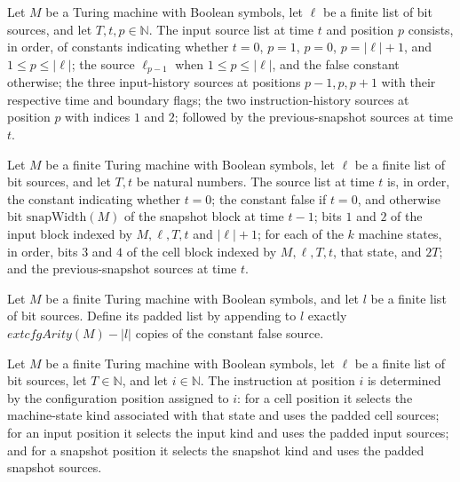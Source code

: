 \begin{definition}
\label{Complexity.inpSrcs}
\leanok
{}
Let $M$ be a Turing machine with Boolean symbols, let $\ell$ be a finite list of bit
sources, and let $T,t,p\in\mathbb{N}$. The input source list at time $t$ and position
$p$ consists, in order, of constants indicating whether $t=0$, $p=1$, $p=0$,
$p=|\ell|+1$, and $1\le p\le |\ell|$; the source $\ell_{p-1}$ when $1\le p\le |\ell|$,
and the false constant otherwise; the three input-history sources at positions
$p-1,p,p+1$ with their respective time and boundary flags; the two instruction-history
sources at position $p$ with indices $1$ and $2$; followed by the previous-snapshot
sources at time $t$.
\end{definition}

\begin{definition}
\label{Complexity.snapSrcs}
\leanok
{}
Let $M$ be a finite Turing machine with Boolean symbols, let $\ell$ be a finite list of
bit sources, and let $T,t$ be natural numbers. The source list at time $t$ is, in order,
the constant indicating whether $t=0$; the constant false if $t=0$, and otherwise bit
$\mathrm{snapWidth}(M)$ of the snapshot block at time $t-1$; bits $1$ and $2$ of the
input block indexed by $M,\ell,T,t$ and $|\ell|+1$; for each of the $k$ machine states,
in order, bits $3$ and $4$ of the cell block indexed by $M,\ell,T,t$, that state, and
$2T$; and the previous-snapshot sources at time $t$.
\end{definition}

\begin{definition}
\label{Complexity.padSrcs}
\leanok
{}
Let $M$ be a finite Turing machine with Boolean symbols, and let $l$ be a finite list of
bit sources. Define its padded list by appending to $l$ exactly $	ext{cfgArity}(M)-|l|$
copies of the constant false source.
\end{definition}

\begin{definition}
\label{Complexity.cfgInstr}
\leanok
{}
Let $M$ be a finite Turing machine with Boolean symbols, let $\ell$ be a finite list of
bit sources, let $T\in\mathbb{N}$, and let $i\in\mathbb{N}$. The instruction at position
$i$ is determined by the configuration position assigned to $i$: for a cell position it
selects the machine-state kind associated with that state and uses the padded cell
sources; for an input position it selects the input kind and uses the padded input
sources; and for a snapshot position it selects the snapshot kind and uses the padded
snapshot sources.
\end{definition}

